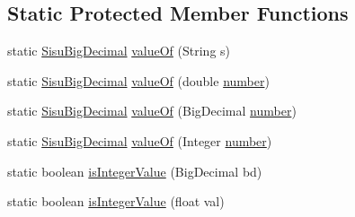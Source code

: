 \subsection*{Static Protected Member Functions}
\begin{DoxyCompactItemize}
\item 
static \hyperlink{classcom_1_1aarrelaakso_1_1drawl_1_1_sisu_big_decimal}{Sisu\+Big\+Decimal} \hyperlink{classcom_1_1aarrelaakso_1_1drawl_1_1_sisu_big_decimal_a076ac8cd04ac04e39f7f3fcc7ce9a4a1}{value\+Of} (String s)
\item 
static \hyperlink{classcom_1_1aarrelaakso_1_1drawl_1_1_sisu_big_decimal}{Sisu\+Big\+Decimal} \hyperlink{classcom_1_1aarrelaakso_1_1drawl_1_1_sisu_big_decimal_abdd37c9d8ee68f034fc15ca6777a1de7}{value\+Of} (double \hyperlink{classcom_1_1aarrelaakso_1_1drawl_1_1_sisu_big_decimal_af27e00f82037e4c3658558cd6c81af06}{number})
\item 
static \hyperlink{classcom_1_1aarrelaakso_1_1drawl_1_1_sisu_big_decimal}{Sisu\+Big\+Decimal} \hyperlink{classcom_1_1aarrelaakso_1_1drawl_1_1_sisu_big_decimal_a251d1a42f8906fe5b7da6981673464d2}{value\+Of} (Big\+Decimal \hyperlink{classcom_1_1aarrelaakso_1_1drawl_1_1_sisu_big_decimal_af27e00f82037e4c3658558cd6c81af06}{number})
\item 
static \hyperlink{classcom_1_1aarrelaakso_1_1drawl_1_1_sisu_big_decimal}{Sisu\+Big\+Decimal} \hyperlink{classcom_1_1aarrelaakso_1_1drawl_1_1_sisu_big_decimal_a9dbb81d513bd251ef0c20696b272ddc3}{value\+Of} (Integer \hyperlink{classcom_1_1aarrelaakso_1_1drawl_1_1_sisu_big_decimal_af27e00f82037e4c3658558cd6c81af06}{number})
\item 
static boolean \hyperlink{classcom_1_1aarrelaakso_1_1drawl_1_1_sisu_big_decimal_a91b8c8917efe62714376acabd7659a00}{is\+Integer\+Value} (Big\+Decimal bd)
\item 
static boolean \hyperlink{classcom_1_1aarrelaakso_1_1drawl_1_1_sisu_big_decimal_ac3cd755159a2833c6b90aece5ca86b7e}{is\+Integer\+Value} (float val)
\end{DoxyCompactItemize}
